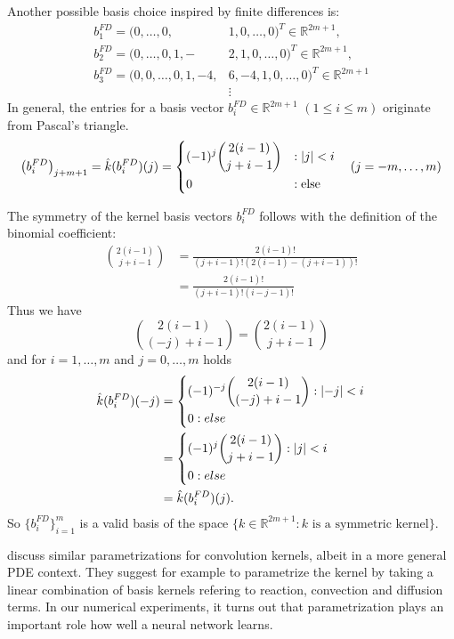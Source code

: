 \documentclass[twoside,a4paper]{article}
\begin{document}
Another possible basis choice inspired by finite differences is:
\begin{align*}
	b_1^{FD} = (0, \dots, 0,& 1,0, \dots, 0)^T \in \mathbb{R}^{2m+1},\\
	b_2^{FD} = (0, \dots, 0, 1,-&2,1, 0, \dots, 0)^T \in \mathbb{R}^{2m+1},\\
	b_3^{FD} = (0, 0, \dots, 0, 1,-4,& 6,-4,1, 0, \dots, 0)^T \in \mathbb{R}^{2m+1} \\
	&\vdots
\end{align*}
In general, the entries for a basis vector $b_i^{FD} \in \mathbb{R}^{2m+1}$ $(1 \leq i \leq m)$ 
originate from Pascal's triangle.
\begin{equation*}
	\left( b_i^{FD} \right)_{j+m+1} = \hat{k}(b_i^{FD})(j) = \begin{dcases}
		(-1)^j \binom{2(i-1)}{j+i-1} &: \left|{j}\right| < i \\
		0 &: \text{else}
	\end{dcases}
	\quad (j=-m, \dots, m)
\end{equation*}

The symmetry of the kernel basis vectors $b_i^{FD}$ follows with the definition of the binomial coefficient:
\begin{align*}
	\binom{2(i-1)}{j+i-1} &= \frac{2(i-1)!}{(j+i-1)!(2(i-1)-(j+i-1))!} \\
	&= \frac{2(i-1)!}{(j+i-1)!(i-j-1)!}
\end{align*}
Thus we have
\begin{equation*}
	\binom{2(i-1)}{(-j)+i-1} = \binom{2(i-1)}{j+i-1}
\end{equation*}
and for $i=1, \dots, m$ and $j= 0, \dots, m$ holds
\begin{align*}
	\hat{k}(b_i^{FD})(-j) &= \begin{dcases}
		(-1)^{-j} \binom{2(i-1)}{(-j)+i-1} : \left|{-j}\right| < i \\
		0 : else
	\end{dcases} \\
	&= \begin{dcases}
		(-1)^{j} \binom{2(i-1)}{j+i-1} : \left|{j}\right| < i \\
		0 : else
	\end{dcases} \\
	&= \hat{k}(b_i^{FD})(j)
	.
\end{align*}
So $\{ b_i^{FD} \}_{i=1}^m$ is a valid basis of
the space $\{ k \in \mathbb{R}^{2m+1} : k \text{ is a symmetric kernel} \}$.

\citet{Ruthotto2020} discuss similar parametrizations for
convolution kernels, albeit in a more general PDE context. They
suggest for example to parametrize the kernel by taking a linear combination
of basis kernels refering to reaction, convection and diffusion terms.
In our numerical experiments, it turns out that
parametrization plays an important role how well a neural network learns.
\end{document}
